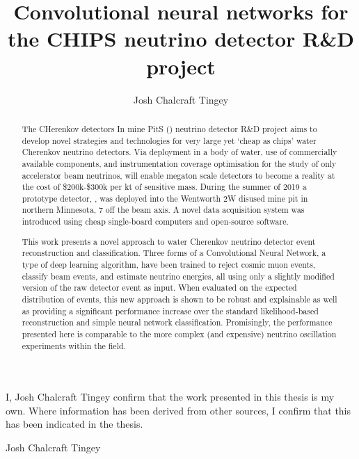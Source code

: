 
\title{Convolutional neural networks for the CHIPS neutrino detector R\&D project}
\author{Josh Chalcraft Tingey}

\thispagestyle{plain}

\begin{declaration} %
    I, Josh Chalcraft Tingey confirm that the work presented in this thesis is my own. Where
    information has been derived from other sources, I confirm that this has been indicated in the
    thesis.
    \vspace*{1cm}
    \begin{flushright}
        Josh Chalcraft Tingey
    \end{flushright}
\end{declaration}

\begin{abstract} %
    The CHerenkov detectors In mine PitS (\chips) neutrino detector R\&D project aims to develop
    novel strategies and technologies for very large yet `cheap as chips' water Cherenkov neutrino
    detectors. Via deployment in a body of water, use of commercially available components, and
    instrumentation coverage optimisation for the study of only accelerator beam neutrinos, \chips
    will enable megaton scale detectors to become a reality at the cost of \$200k-\$300k per kt of
    sensitive mass. During the summer of 2019 a prototype \chips detector, \chipsfive, was
    deployed into the Wentworth 2W disused mine pit in northern Minnesota, \SI{7}{} off
    the \numi beam axis. A novel data acquisition system was introduced using cheap single-board
    computers and open-source software.

    This work presents a novel approach to water Cherenkov neutrino detector event reconstruction
    and classification. Three forms of a Convolutional Neural Network, a type of deep learning
    algorithm, have been trained to reject cosmic muon events, classify beam events, and estimate
    neutrino energies, all using only a slightly modified version of the raw detector event as
    input. When evaluated on the expected distribution of \chipsfive events, this new approach is
    shown to be robust and explainable as well as providing a significant performance increase
    over the standard likelihood-based reconstruction and simple neural network classification.
    Promisingly, the performance presented here is comparable to the more complex (and expensive)
    neutrino oscillation experiments within the field.
\end{abstract}

